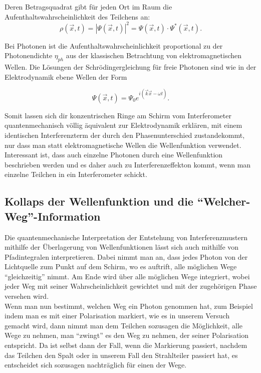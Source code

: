 \documentclass[a4paper,ngerman]{scrartcl}
\begin{document}
Deren Betragsquadrat gibt für jeden Ort im Raum die Aufenthaltswahrscheinlichkeit des Teilchens an:
\begin{equation}
  \rho(\vec{x},t) = |\Psi(\vec{x},t)|^2 = \Psi(\vec{x},t) \cdot \Psi^*(\vec{x},t).
\end{equation}

Bei Photonen ist die Aufenthaltswahrscheinlichkeit proportional zu der Photonendichte $\eta_{ph}$ aus der klassischen Betrachtung von elektromagnetischen Wellen. Die Lösungen der Schrödingergleichung für freie Photonen sind wie in der Elektrodynamik ebene Wellen der Form

\begin{equation}
  \Psi(\vec{x},t) = \Psi_0 e^{i(\vec{k}\vec{x}-\omega t)}.
\end{equation}

Somit lassen sich dir konzentrischen Ringe am Schirm vom Interferometer quantenmechanisch völlig äquivalent zur Elektrodynamik erklären,
mit einem identischen Interferenzterm der durch den Phasenunterschied zustandekommt,
nur dass man statt elektromagnetische Wellen die Wellenfunktion verwendet. \\

Interessant ist, dass auch einzelne Photonen durch eine Wellenfunktion beschrieben werden und es daher auch zu Interferenzeffekton kommt,
wenn man einzelne Teilchen in ein Interferometer schickt.


\subsection{Kollaps der Wellenfunktion und die "`Welcher-Weg"'-Information}
\label{sec:welcher-weg}
Die quantenmechanische Interpretation der Entstehung von Interferenzmustern mithilfe der Überlagerung von Wellenfunktionen lässt sich auch
mithilfe von Pfadintegralen interpretieren. Dabei nimmt man an, dass jedes Photon von der Lichtquelle zum Punkt auf dem Schirm, wo es auftrift,
alle möglichen Wege "`gleichzeitig"' nimmt. Am Ende wird über alle möglichen Wege integriert, wobei jeder Weg mit seiner Wahrscheinlichkeit
gewichtet und mit der zugehörigen Phase versehen wird.\\

Wenn man nun bestimmt, welchen Weg ein Photon genommen hat, zum Beispiel indem man es mit einer Polarisation markiert, wie es in unserem Versuch gemacht wird, dann nimmt man dem Teilchen sozusagen die Möglichkeit, alle Wege zu nehmen, man "`zwingt"' es den Weg zu nehmen, der seiner 
Polarisation entspricht. Da ist selbst dann der Fall, wenn die Markierung passiert, nachdem das Teilchen den Spalt oder in unserem Fall den Strahlteiler passiert hat, es entscheidet sich sozusagen nachträglich für einen der Wege.\\
\end{document}
